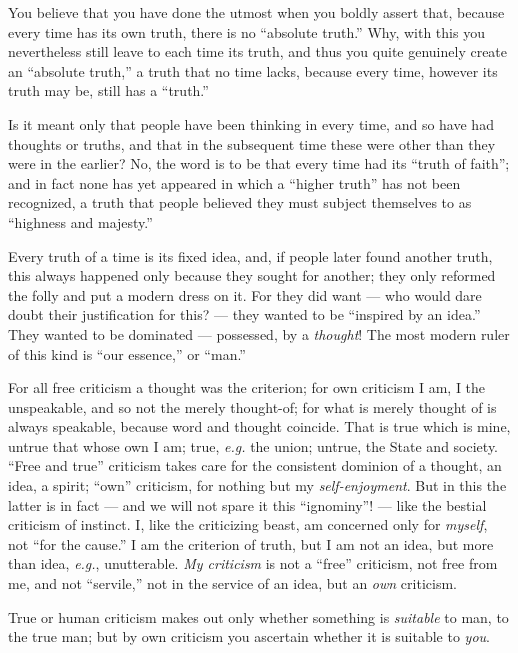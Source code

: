 You believe that you have done the utmost when you boldly assert that, because 
every time has its own truth, there is no ``absolute truth.'' Why, with this 
you nevertheless still leave to each time its truth, and thus you quite 
genuinely create an ``absolute truth,'' a truth that no time lacks, because 
every time, however its truth may be, still has a ``truth.''

Is it meant only that people have been thinking in every time, and so have had 
thoughts or truths, and that in the subsequent time these were other than they 
were in the earlier? No, the word is to be that every time had its ``truth of 
faith''; and in fact none has yet appeared in which a ``higher truth'' has 
not been recognized, a truth that people believed they must subject themselves 
to as ``highness and majesty.''

Every truth of a time is its fixed idea, and, if people later found another 
truth, this always happened only because they sought for another; they only 
reformed the folly and put a modern dress on it. For they did want --- who 
would dare doubt their justification for this? --- they wanted to be 
``inspired by an idea.'' They wanted to be dominated --- possessed, by a 
\textit{thought}! The most modern ruler of this kind is ``our essence,'' or 
``man.''

For all free criticism a thought was the criterion; for own criticism I am, I 
the unspeakable, and so not the merely thought-of; for what is merely thought 
of is always speakable, because word and thought coincide. That is true which 
is mine, untrue that whose own I am; true, \textit{e.g.} the union; untrue, 
the State and society. ``Free and true'' criticism takes care for the 
consistent dominion of a thought, an idea, a spirit; ``own'' criticism, for 
nothing but my \textit{self-enjoyment}. But in this the latter is in fact --- and we will not spare it this ``ignominy''! --- like the bestial criticism of 
instinct. I, like the criticizing beast, am concerned only for 
\textit{myself}, not ``for the cause.'' I am the criterion of truth, but I 
am not an idea, but more than idea, \textit{e.g.}, unutterable. \textit{My 
criticism} is not a ``free'' criticism, not free from me, and not 
``servile,'' not in the service of an idea, but an \textit{own} criticism.

True or human criticism makes out only whether something is \textit{suitable} 
to man, to the true man; but by own criticism you ascertain whether it is 
suitable to \textit{you}.

